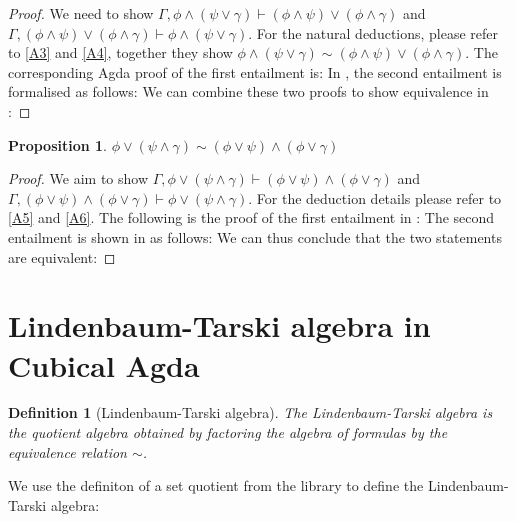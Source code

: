 \documentclass[titlepage]{article}
\newtheorem{definition}{Definition}[section]
\newtheorem{proposition}{Proposition}
\begin{document}
\begin{proof}
    We need to show $\Gamma, \phi \wedge (\psi \vee \gamma) \vdash (\phi \wedge \psi) \vee (\phi \wedge \gamma)$ and $\Gamma, (\phi \wedge \psi) \vee (\phi \wedge \gamma) \vdash \phi \wedge (\psi \vee \gamma)$. For the natural deductions, please refer to \ref{A3} and \ref{A4}, together they show $\phi \wedge (\psi \vee \gamma) \sim (\phi \wedge \psi) \vee (\phi \wedge \gamma)$. The corresponding Agda proof of the first entailment is:
    In \Agda, the second entailment is formalised as follows:
    We can combine these two proofs to show equivalence in \Agda:
\end{proof}

\begin{proposition}
    $\phi \vee (\psi \wedge \gamma) \sim (\phi \vee \psi) \wedge (\phi \vee \gamma)$
\end{proposition}

\begin{proof}
    We aim to show $\Gamma, \phi \vee (\psi \wedge \gamma) \vdash (\phi \vee \psi) \wedge (\phi \vee \gamma)$ and $\Gamma, (\phi \vee \psi) \wedge (\phi \vee \gamma) \vdash \phi \vee (\psi \wedge \gamma)$. For the deduction details please refer to \ref{A5} and \ref{A6}. The following is the proof of the first entailment in \Agda:
    The second entailment is shown in \Agda as follows:
    We can thus conclude that the two statements are equivalent:
\end{proof}





\section{Lindenbaum-Tarski algebra in Cubical Agda}

\begin{definition}[Lindenbaum-Tarski algebra]
    The Lindenbaum-Tarski algebra is the quotient algebra obtained by factoring the algebra of formulas by the equivalence relation $\sim$.
\end{definition}
We use the definiton of a set quotient from the \agdaCubical library to define the Lindenbaum-Tarski algebra:
\end{document}
